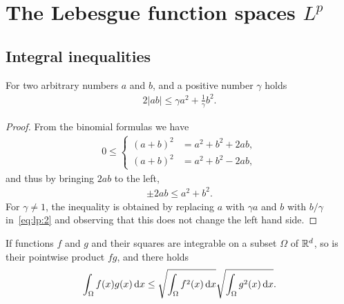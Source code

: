 
\section{The Lebesgue function spaces $L^p$}
\label{sec:lp}

\subsection{Integral inequalities}

\begin{lemma}
  For two arbitrary numbers $a$ and $b$, and a positive number
  $\gamma$ holds
  \begin{gather}
    \label{eq:lp:1}
    2\left|ab\right| \le \gamma a^2 + \frac1\gamma b^2.
  \end{gather}
\end{lemma}
\begin{proof}
  From the binomial formulas we have
  \begin{gather*}
    0 \le
    \begin{cases}
      (a+b)^2 &= a^2+b^2+2ab,
      \\
      (a+b)^2 &= a^2+b^2-2ab,
    \end{cases}
  \end{gather*}
  and thus by bringing $2ab$ to the left,
  \begin{gather}
    \label{eq:lp:2}
    \pm 2ab \le a^2+b^2.
  \end{gather}
  For $\gamma \neq 1$, the inequality is obtained by replacing $a$
  with $\gamma a$ and $b$ with $b/\gamma$ in~\eqref{eq:lp:2} and
  observing that this does not change the left hand side.
\end{proof}

\begin{lemma}
  If functions $f$ and $g$ and their squares are integrable on a
  subset $\Omega$ of $\mathbb R^d$, so is their pointwise product $fg$, and
  there holds
  \begin{gather}
    \label{eq:lp:3}
    \int_\Omega f(x)g(x)\,\mathrm{d} x \le \sqrt{\int_\Omega f^2(x)\,\mathrm{d} x} \sqrt{\int_\Omega g^2(x)\,\mathrm{d} x}.
  \end{gather}
\end{lemma}

